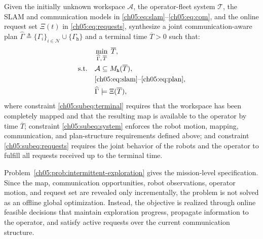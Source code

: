 \begin{problem}
\label{ch05:prob:intermittent-exploration}
Given the initially unknown workspace $\mathcal{A}$, the operator-fleet system
$\mathcal{T}$, the SLAM and communication models in
\eqref{ch05:eq:slam}--\eqref{ch05:eq:com}, and the online request set
$\Xi(t)$ in \eqref{ch05:eq:requests}, synthesize a joint
communication-aware plan
$\widehat{\Gamma} \triangleq
\{\Gamma_i\}_{i \in \mathcal{N}} \cup \{\Gamma_{\texttt{h}}\}$
and a terminal time $\overline{T} > 0$ such that:
\begin{subequations}
\begin{align}
& \min_{\widehat{\Gamma},\, \overline{T}} \; \overline{T},
\label{ch05:eq:problem_obj}
\\
\text{s.t.} \quad
& \mathcal{A} \subseteq M_{\texttt{h}}(\overline{T}),
\label{ch05:subeq:terminal}
\\
& \eqref{ch05:eq:slam}\text{--}\eqref{ch05:eq:plan},
\label{ch05:subeq:system}
\\
& \widehat{\Gamma} \models \Xi(\overline{T}),
\label{ch05:subeq:requests}
\end{align}
\label{ch05:eq:problem}
\end{subequations}
where constraint \eqref{ch05:subeq:terminal} requires that the workspace has been
completely mapped and that the resulting map is available to the operator by
time $\overline{T}$; constraint \eqref{ch05:subeq:system} enforces the robot
motion, mapping, communication, and plan-structure requirements defined above;
and constraint \eqref{ch05:subeq:requests} requires the joint behavior of the
robots and the operator to fulfill all requests received up to the terminal
time.
\end{problem}


Problem~\ref{ch05:prob:intermittent-exploration} gives the mission-level
specification. Since the map, communication opportunities, robot observations,
operator motion, and request set are revealed only incrementally, the problem is
not solved as an offline global optimization. Instead, the objective is realized
through online feasible decisions that maintain exploration progress, propagate
information to the operator, and satisfy active requests over the current
communication structure.















